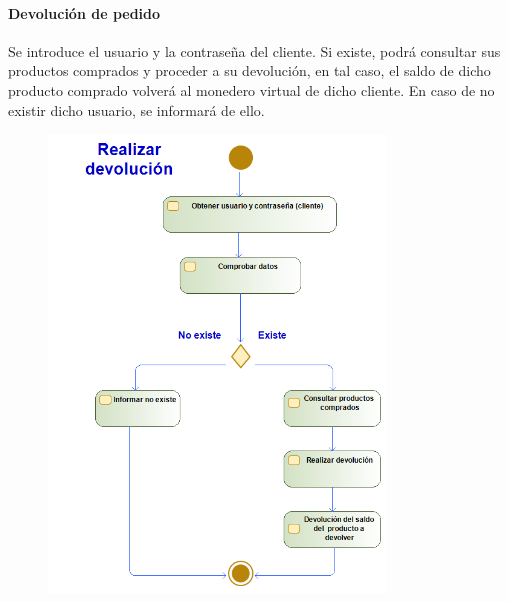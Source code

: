 \paragraph{Devolución de pedido}
Se introduce el usuario y la contraseña del cliente. Si existe, podrá consultar sus productos comprados y proceder a su devolución, en tal caso, el saldo de dicho producto comprado volverá al monedero virtual de dicho cliente. En caso de no existir dicho usuario, se informará de ello.
\begin{figure}[H]
    \centering
    \includegraphics[width=0.8\textwidth]{Use_Cases/realizar_devolucion.png}
\end{figure}
